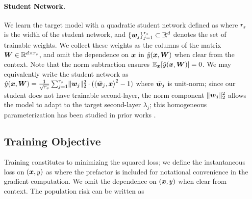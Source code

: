 \paragraph{Student Network.} We learn the target model with a quadratic student network defined as  
where $r_s$ is the width of the student network, and $\{\boldsymbol{w}_j\}_{j=1}^{r_s} \subset \mathbb{R}^d$ denotes the set of trainable weights. We collect these weights as the columns of the matrix $\boldsymbol{W} \in \mathbb{R}^{d \times r_s}$, and omit the dependence on $\boldsymbol{x}$ in $\hat y(\boldsymbol{x}, \boldsymbol{W})$ when clear from the context. 
Note that the norm subtraction ensures $\mathbb{E}_{\boldsymbol{x}}[\hat{y}(\boldsymbol{x}, \boldsymbol{W})] = 0$. 
We may equivalently write the student network as $\hat y(\boldsymbol{x}, \boldsymbol{W}) = \frac{1}{ \sqrt{r_s}} \sum_{j = 1}^{r_s}  \lVert\boldsymbol{w}_j\rVert_2^2 \cdot (\left \langle \bar{\boldsymbol{w}}_j, \boldsymbol{x} \right \rangle^2 - 1)$ where $\bar{\boldsymbol{w}}_j$ is unit-norm;
since our student does not have trainable second-layer, 
the norm component $\lVert\boldsymbol{w}_j\rVert_2^2$ allows the model to adapt to 
the target second-layer $\lambda_j$; this homogeneous parameterization has been studied in prior works 
\cite{chizat2020implicit,ge2021understanding}. 


\subsection{Training Objective}
Training constitutes to minimizing the squared loss; we define the instantaneous loss on $(\boldsymbol{x},y)$ as
where the prefactor is included for notational convenience in the gradient computation. 
We omit the dependence on $(\boldsymbol{x}, y)$ when clear from context. The population risk can be written as

